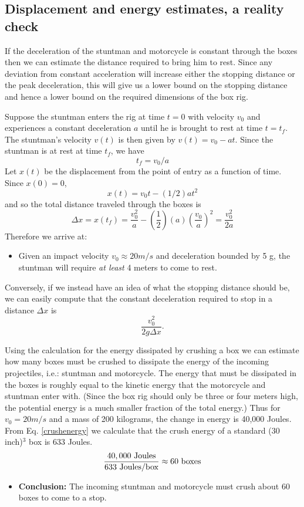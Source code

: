 \documentclass[12pt,a4paper,titlepage]{article}
\begin{document}
\subsection{Displacement and energy estimates, a reality check}

If the deceleration of the stuntman and motorcycle is constant through the boxes then
we can estimate the distance required to bring him to rest.  Since any
deviation from constant acceleration will increase either the stopping distance or the
peak deceleration, this will give us a lower bound  on the stopping distance and hence a lower bound
on the required dimensions of the box rig.

Suppose the stuntman enters the rig at time $t=0$ with velocity $v_0$ and experiences a
constant deceleration $a$ until he is brought to rest at time $t=t_f$.  The stuntman's
velocity $v(t)$ is then given by $v(t) = v_0 - at$.  Since the stuntman is at rest at time $t_f$, we have
$$
t_f = v_0/a
$$
Let $x(t)$ be the displacement from the point of entry as a function of time.  Since $x(0) = 0$,
$$
x(t) = v_0t - (1/2)at^2
$$
and so the total distance traveled through the boxes is
$$
\Delta x = x(t_f) = \frac{v_0^2}{a} - \left(\frac{1}{2}\right)(a)\left(\frac{v_0}{a}\right)^2 = \frac{v_0^2}{2a}
$$
Therefore we arrive at:
\begin{itemize}
\item Given an impact velocity $v_0 \approx 20 m/s$ and deceleration bounded by 5 g, the stuntman will require {\it at least} 4 meters to come to rest.
\end{itemize}

Conversely, if we instead have an idea of what the stopping distance should be, we can easily compute
that the constant deceleration required to stop in a distance $\Delta x$ is $$ \frac{v_{0}^{2}}{2g\Delta x}.$$

Using the calculation for the energy dissipated by crushing a box we can estimate how many boxes must
be crushed to dissipate the energy of the incoming projectiles, i.e.: stuntman and motorcycle.
The energy that must be dissipated in the boxes is roughly equal to the kinetic energy that the
motorcycle and stuntman enter with.  (Since the box rig should only be three or four meters high,
the potential energy is a much smaller fraction of the total energy.)  Thus for $v_{0} = 20 m/s$
and a mass of 200 kilograms, the change in energy is 40,000 Joules.  From Eq. \ref{crushenergy} we
calculate that the crush energy of a standard (30 inch)$^3$ box is 633 Joules.
$$
\frac{40,000 \hbox{ Joules}}{633 \hbox{ Joules/box}} \approx 60 \hbox{ boxes}
$$
\begin{itemize}
\item {\bf Conclusion:} The incoming stuntman and motorcycle must crush about 60 boxes to come to a stop.
\end{itemize}
\end{document}
